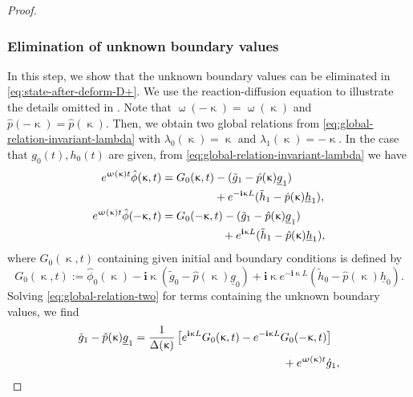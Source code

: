 \documentclass[journal,twoside,web]{ieeecolor}
\newcommand{\state}{\phi}
\newcommand{\statehat}{\hat{\state}}
\newcommand{\im}{\mathbf{i}}
\newcommand{\wcomplex}{\upomega}
\newcommand{\kcomplex}{\upkappa}
\begin{document}
\begin{proof}
\subsubsection{Elimination of unknown boundary values}
\label{sec:elimination-unknown-boundary-reaciton}
In this step, we show that the unknown boundary values can be eliminated in \eqref{eq:state-after-deform-D+}.
We use the reaction-diffusion equation to illustrate the details omitted in . 
Note that $\wcomplex(-\kcomplex)=\wcomplex(\kcomplex)$ and $\hat{p}(-\kcomplex)=\hat{p}(\kcomplex)$. Then, we obtain two global relations from \eqref{eq:global-relation-invariant-lambda} with $\lambda_0(\kcomplex)=\kcomplex$ and $\lambda_1(\kcomplex)=-\kcomplex$.
In the case that $g_0(t), h_0(t)$ are given, from \eqref{eq:global-relation-invariant-lambda} we have
\begin{equation}\label{eq:global-relation-two}
	\begin{aligned}
		e^{\wcomplex(\kcomplex)t}\statehat(\kcomplex,t)&=G_0(\kcomplex,t) - (\tilde{g}_1 - \hat{p}(\kcomplex)\underline{g}_1) \\ & \hspace{0.65in}+ e^{-\im \kcomplex L}(\tilde{h}_1 -\hat{p}(\kcomplex) \underline{h}_1), \\ 
		e^{\wcomplex(\kcomplex)t}\statehat(-\kcomplex,t)&=G_0(-\kcomplex,t) - (\tilde{g}_1 - \hat{p}(\kcomplex)\underline{g}_1) \\ & \hspace{0.75in}+ e^{\im \kcomplex L}(\tilde{h}_1 -\hat{p}(\kcomplex) \underline{h}_1),
	\end{aligned}
\end{equation}
where $G_0(\kcomplex,t)$ containing given initial and boundary conditions is defined by
\begin{equation*}
	G_0(\kcomplex,t) := \statehat_0(\kcomplex) - \im \kcomplex(\tilde{g}_0 -\hat{p}(\kcomplex) \underline{g}_0) + \im \kcomplex e^{-\im \kcomplex L}(\tilde{h}_0 -\hat{p}(\kcomplex) \underline{h}_0).
\end{equation*}
Solving \eqref{eq:global-relation-two} for terms containing the unknown boundary values, we find
\begin{equation*}
	\begin{aligned}
		\tilde{g}_1 - \hat{p}(\kcomplex)\underline{g}_1&= \frac{1}{\Delta(\kcomplex)}\left[e^{\im \kcomplex L}G_0(\kcomplex,t)-e^{-\im \kcomplex L}G_0(-\kcomplex,t)\right] \\ & \hspace{1.85in}+ e^{\wcomplex(\kcomplex)t}\acute{g}_1,\\

\end{aligned}
\end{equation*}
\end{proof}
\end{document}
